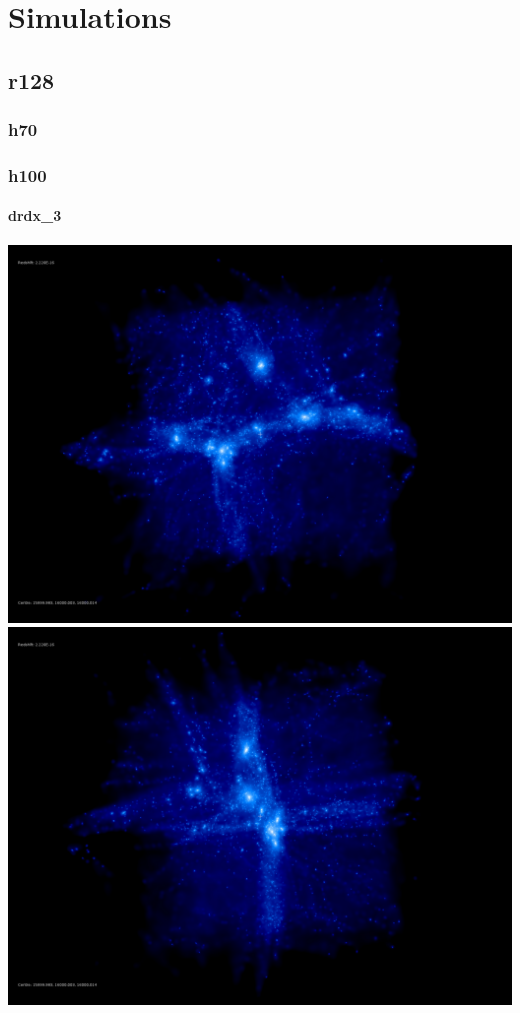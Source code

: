 \documentclass[a4paper,11pt,fleqn,oneside]{book}
\begin{document}
\chapter{Simulations} %

\section{r128} %

\subsection{h70} %

\newpage
\subsection{h100} %

\subsubsection{drdx\_3} 

\includegraphics[scale=0.12]{drdx_3/rotate_00185.jpg} 
\includegraphics[scale=0.12]{drdx_3/rotate_00136.jpg} 
\end{document}
